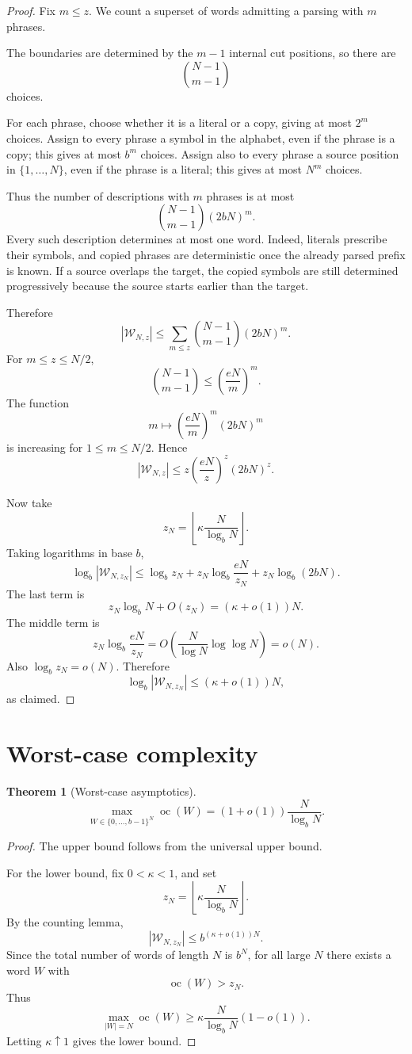 \documentclass[11pt]{amsart}
\newtheorem{theorem}{Theorem}[section]
\DeclareMathOperator{\oc}{oc}
\begin{document}
\begin{proof}
Fix $m\leq z$. We count a superset of words admitting a parsing with $m$ phrases.

The boundaries are determined by the $m-1$ internal cut positions, so there are
\[
\binom{N-1}{m-1}
\]
choices.

For each phrase, choose whether it is a literal or a copy, giving at most $2^m$ choices. Assign to every phrase a symbol in the alphabet, even if the phrase is a copy; this gives at most $b^m$ choices. Assign also to every phrase a source position in $\{1,\ldots,N\}$, even if the phrase is a literal; this gives at most $N^m$ choices.

Thus the number of descriptions with $m$ phrases is at most
\[
\binom{N-1}{m-1}(2bN)^m.
\]
Every such description determines at most one word. Indeed, literals prescribe their symbols, and copied phrases are deterministic once the already parsed prefix is known. If a source overlaps the target, the copied symbols are still determined progressively because the source starts earlier than the target.

Therefore
\[
|\mathcal W_{N,z}|
\leq
\sum_{m\leq z}
\binom{N-1}{m-1}(2bN)^m.
\]
For $m\leq z\leq N/2$,
\[
\binom{N-1}{m-1}
\leq
\left(\frac{eN}{m}\right)^m.
\]
The function
\[
m\mapsto
\left(\frac{eN}{m}\right)^m(2bN)^m
\]
is increasing for $1\leq m\leq N/2$. Hence
\[
|\mathcal W_{N,z}|
\leq
z\left(\frac{eN}{z}\right)^z(2bN)^z.
\]

Now take
\[
z_N=\left\lfloor \kappa\frac{N}{\log_b N}\right\rfloor.
\]
Taking logarithms in base $b$,
\[
\log_b |\mathcal W_{N,z_N}|
\leq
\log_b z_N
+
z_N\log_b\frac{eN}{z_N}
+
z_N\log_b(2bN).
\]
The last term is
\[
z_N\log_b N+O(z_N)
=
(\kappa+o(1))N.
\]
The middle term is
\[
z_N\log_b\frac{eN}{z_N}
=
O\left(\frac{N}{\log N}\log\log N\right)
=
o(N).
\]
Also $\log_b z_N=o(N)$. Therefore
\[
\log_b |\mathcal W_{N,z_N}|
\leq
(\kappa+o(1))N,
\]
as claimed.
\end{proof}

\section{Worst-case complexity}

\begin{theorem}[Worst-case asymptotics]
\[
\max_{W\in\{0,\ldots,b-1\}^N}\oc(W)
=
(1+o(1))\frac{N}{\log_b N}.
\]
\end{theorem}

\begin{proof}
The upper bound follows from the universal upper bound.

For the lower bound, fix $0<\kappa<1$, and set
\[
z_N=\left\lfloor \kappa\frac{N}{\log_b N}\right\rfloor.
\]
By the counting lemma,
\[
|\mathcal W_{N,z_N}|
\leq
b^{(\kappa+o(1))N}.
\]
Since the total number of words of length $N$ is $b^N$, for all large $N$ there exists a word $W$ with
\[
\oc(W)>z_N.
\]
Thus
\[
\max_{|W|=N}\oc(W)
\geq
\kappa\frac{N}{\log_b N}(1-o(1)).
\]
Letting $\kappa\uparrow1$ gives the lower bound.
\end{proof}
\end{document}

